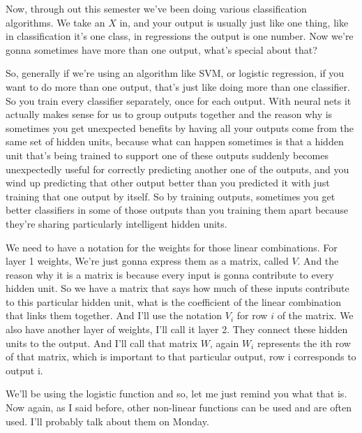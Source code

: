 \documentclass[fleqn,10pt]{olplainarticle}
\theoremstyle{definition}
\theoremstyle{remark}
\begin{document}
Now, through out this semester we've been doing various classification algorithms. We take an $X$ in, and your output is usually just like one thing, like in classification it's one class, in regressions the output is one number. Now we're gonna sometimes have more than one output, what's special about that?

So, generally if we're using an algorithm like SVM, or logistic regression, if you want to do more than one output, that's just like doing more than one classifier. So you train every classifier separately, once for each output. With neural nets it actually makes sense for us to group outputs together and the reason why is sometimes you get unexpected benefits by having all your outputs come from the same set of hidden units, because what can happen sometimes is that a hidden unit that's being trained to support one of these outputs suddenly becomes unexpectedly useful for correctly predicting another one of the outputs, and you wind up predicting that other output better than you predicted it with just training that one output by itself. So by training outputs, sometimes you get better classifiers in some of those outputs than you training them apart because they're sharing particularly intelligent hidden units. 

We need to have a notation for the weights for those linear combinations. For layer 1 weights, We're just gonna express them as a matrix, called $V$. And the reason why it is a matrix is because every input is gonna contribute to every hidden unit. So we have a matrix that says how much of these inputs contribute to this particular hidden unit, what is the coefficient of the linear combination that links them together. And I'll use the notation $V_i$ for row $i$ of the matrix. We also have another layer of weights, I'll call it layer 2. They connect these hidden units to the output. And I'll call that matrix $W$, again $W_i$ represents the ith row of that matrix, which is important to that particular output, row i corresponds to output i. 

We'll be using the logistic function and so, let me just remind you what that is. Now again, as I said before, other non-linear functions can be used and are often used. I'll probably talk about them on Monday. 
\end{document}

